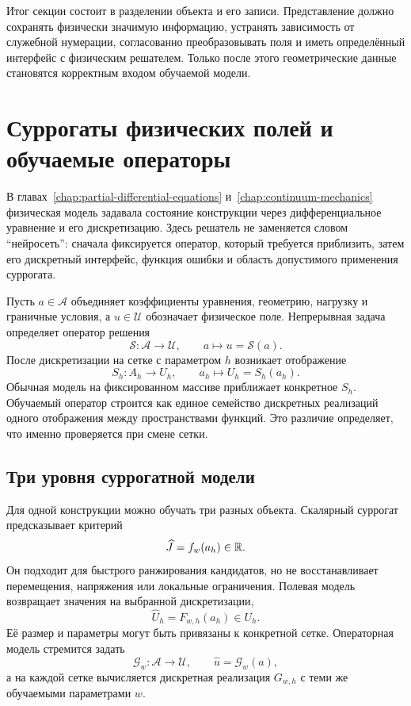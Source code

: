 Итог секции состоит в разделении объекта и его записи. Представление должно сохранять физически значимую информацию, устранять зависимость от служебной нумерации, согласованно преобразовывать поля и иметь определённый интерфейс с физическим решателем. Только после этого геометрические данные становятся корректным входом обучаемой модели.

\section{Суррогаты физических полей и обучаемые операторы}
\label{sec:surrogates-neural-operators}
В главах~\ref{chap:partial-differential-equations} и~\ref{chap:continuum-mechanics} физическая модель задавала состояние конструкции через дифференциальное уравнение и его дискретизацию. Здесь решатель не заменяется словом ``нейросеть'': сначала фиксируется оператор, который требуется приблизить, затем его дискретный интерфейс, функция ошибки и область допустимого применения суррогата.

Пусть $a\in\mathcal A$ объединяет коэффициенты уравнения, геометрию, нагрузку и граничные условия, а $u\in\mathcal U$ обозначает физическое поле. Непрерывная задача определяет оператор решения
\begin{equation}
\label{eq:solution-operator}
 \mathcal S:\mathcal A\to\mathcal U,
 \qquad
 a\longmapsto u=\mathcal S(a).
\end{equation}
После дискретизации на сетке с параметром $h$ возникает отображение
\begin{equation}
 S_h:A_h\to U_h,
 \qquad
 a_h\longmapsto U_h=S_h(a_h).
\end{equation}
Обычная модель на фиксированном массиве приближает конкретное $S_h$. Обучаемый оператор строится как единое семейство дискретных реализаций одного отображения между пространствами функций. Это различие определяет, что именно проверяется при смене сетки.

\subsection{Три уровня суррогатной модели}
Для одной конструкции можно обучать три разных объекта. Скалярный суррогат предсказывает критерий
\begin{equation}
 \widehat J=f_w(a_h)\in\mathbb{R}.
\end{equation}
Он подходит для быстрого ранжирования кандидатов, но не восстанавливает перемещения, напряжения или локальные ограничения. Полевая модель возвращает значения на выбранной дискретизации,
\begin{equation}
 \widehat U_h=F_{w,h}(a_h)\in U_h.
\end{equation}
Её размер и параметры могут быть привязаны к конкретной сетке. Операторная модель стремится задать
\begin{equation}
 \mathcal G_w:\mathcal A\to\mathcal U,
 \qquad
 \widehat u=\mathcal G_w(a),
\end{equation}
а на каждой сетке вычисляется дискретная реализация $G_{w,h}$ с теми же обучаемыми параметрами $w$.

